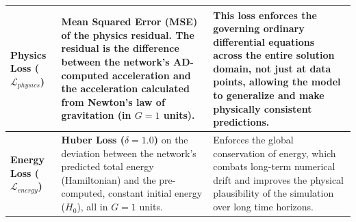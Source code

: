 \documentclass{article}
\begin{document}
\begin{small}
\begin{longtable}{|>{\raggedright\arraybackslash}p{}|>{\raggedright\arraybackslash}p{}|>{\raggedright\arraybackslash}p{}|}
\textbf{Physics Loss ($\mathcal{L}_{physics}$)} & \textbf{Mean Squared Error (MSE)} of the physics residual. The residual is the difference between the network's AD-computed acceleration and the acceleration calculated from Newton's law of gravitation (in $G=1$ units). & This loss enforces the governing ordinary differential equations across the entire solution domain, not just at data points, allowing the model to generalize and make physically consistent predictions. \\
\hline
\textbf{Energy Loss ($\mathcal{L}_{energy}$)} & \textbf{Huber Loss ($\delta=1.0$)} on the deviation between the network's predicted total energy (Hamiltonian) and the pre-computed, constant initial energy ($H_0$), all in $G=1$ units. & Enforces the global conservation of energy, which combats long-term numerical drift and improves the physical plausibility of the simulation over long time horizons. \\
\hline
\end{longtable}
\end{small}
\end{document}
